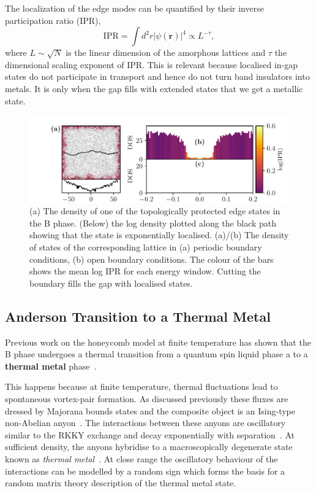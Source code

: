 The localization of the edge modes can be quantified by their inverse participation ratio (IPR), \[\mathrm{IPR} = \int d^2r|\psi(\mathbf{r})|^4  \propto L^{-\tau},\] where \(L\sim\sqrt{N}\) is the linear dimension of the amorphous lattices and \(\tau\) the dimensional scaling exponent of IPR. This is relevant because localised in-gap states do not participate in transport and hence do not turn band insulators into metals. It is only when the gap fills with extended states that we get a metallic state.

\hypertarget{fig:edge_modes}{%
\begin{figure}
\centering
\includegraphics[width=1\textwidth,height=\textheight]{figure_code/amk_chapter/results/edge_modes/edge_modes}
\caption[{Edges States and Density of States}]{(a) The density of one of the topologically protected edge states in the B phase. (Below) the log density plotted along the black path showing that the state is exponentially localised. (a)/(b) The density of states of the corresponding lattice in (a) periodic boundary conditions, (b) open boundary conditions. The colour of the bars shows the mean log IPR for each energy window. Cutting the boundary fills the gap with localised states.}
\label{fig:edge_modes}
\end{figure}
}

\hypertarget{anderson-transition-to-a-thermal-metal}{%
\subsection{Anderson Transition to a Thermal Metal}\label{anderson-transition-to-a-thermal-metal}}

Previous work on the honeycomb model at finite temperature has shown that the B phase undergoes a thermal transition from a quantum spin liquid phase a to a \textbf{thermal metal} phase~\autocite{selfThermallyInducedMetallic2019}.

This happens because at finite temperature, thermal fluctuations lead to spontaneous vortex-pair formation. As discussed previously these fluxes are dressed by Majorana bounds states and the composite object is an Ising-type non-Abelian anyon~\autocite{Beenakker2013}. The interactions between these anyons are oscillatory similar to the RKKY exchange and decay exponentially with separation~\autocite{Laumann2012,Lahtinen_2011,lahtinenTopologicalLiquidNucleation2012}. At sufficient density, the anyons hybridise to a macroscopically degenerate state known as \emph{thermal metal}~\autocite{Laumann2012}. At close range the oscillatory behaviour of the interactions can be modelled by a random sign which forms the basis for a random matrix theory description of the thermal metal state.


